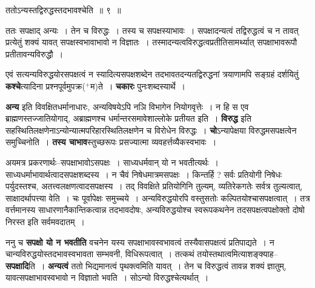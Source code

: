 \documentclass[article,12pt,a4paper]{memoir}
\newcommand{\add}[1]{($^{+}$#1)}
\begin{document}
	  \bigskip
	  \begingroup
	

	  \pstart ततोऽन्यस्तद्विरुद्धस्तदभावश्चेति ॥ ९ ॥
	\pend
      
	  \endgroup
	 

	  \pstart ततः सपक्षाद् अन्यः । तेन च विरुद्धः । तस्य च सपक्षस्याभावः । सपक्षादन्यत्वं तद्विरुद्धत्वं च न तावत् प्रत्येतुं शक्यं यावत् सपक्षस्वभावाभावो न विज्ञातः । तस्मादन्यत्वविरुद्धत्वप्रतीतिसामर्थ्यात् सपक्षाभावरूपौ प्रतीतावन्यविरुद्धौ ।
	\pend
      
	  \endgroup
	

	  \pstart एवं सत्यन्यविरुद्धयोरसपक्षत्वं न स्यादित्यसपक्षशब्देन तदभावतदन्यतद्विरुद्धनां त्रयाणामपि सङ्ग्रहं दर्शयितुं \textbf{कश्चे}त्यादिना प्रश्नपूर्वमुपक्र\add{म}ते । \textbf{चकारः} पुनःशब्दस्यार्थे ।
	\pend
      

	  \pstart \textbf{अन्य} इति विवक्षितधर्मानाधारः, अन्यविषयेऽपि नञि विभागेन नियोगवृत्तेः । न हि स एव ब्राह्मणस्तज्जातियोगाद्, अब्राह्मणश्च धर्मान्तरसमावेशाल्लोके प्रतीयत इति । \textbf{विरुद्ध} इति सहस्थितिलक्षणेनाऽन्योन्यात्मपरिहारस्थितिलक्षणेन च विरोधेन विरुद्धः । \textbf{चो}ऽन्यापेक्षया विरुद्धमसपक्षत्वेन समुच्चिनोति । \textbf{तस्य चाभाव}स्तुच्छरूपः प्रसज्यात्मा व्यवहर्त्तव्यैकस्वभावः ।
	\pend
      

	  \pstart अयमत्र प्रकरणार्थः--सपक्षाभावोऽसपक्षः । साध्यधर्मवान् यो न भवतीत्यर्थः । साध्यधर्माभावार्थत्वादसपक्षशब्दस्य । न चैवं निषेधमात्रमसपक्षः । किन्तर्हि ? सर्वः प्रतियोगी निषेधः पर्युदस्तश्च, अतत्त्वलक्षणत्वादसपक्षस्य । तद् विवक्षिते प्रतियोगिनि तुल्यम्, व्यतिरेकगतेः सर्वत्र तुल्यत्वात्, साक्षादर्थापत्त्या वेति । चः पूर्वापेक्षः समुच्चये । अन्यविरुद्धयोरपि वस्तुसतोः कल्पितयोश्चासपक्षत्वात् । तत्र वर्त्तमानस्य साधारणानैकान्तिकत्वान्न तदभावदोषः, अन्यविरुद्धयोश्च स्वरूपकथनेन तदसपक्षत्वपक्षोक्तो दोषो निरस्त इति सर्वमवदातम् ।
	\pend
      

	  \pstart ननु च \textbf{सपक्षो यो न भवतीति} वचनेन यस्य सपक्षाभावस्वभावत्वं तस्यैवासपक्षत्वं \leavevmode{}प्रतिपाद्यते । न चान्यविरुद्धयोस्तदभावस्वभावता सम्भवनी, विधिरूपत्वात् । तत्कथं तयोस्तथात्वमित्याशङ्क्याह--\textbf{सपक्षादि}ति । \textbf{अन्यत्वं} ततो भिद्यमानत्वं पृथक्त्वमिति यावत् । तेन च विरुद्धत्वं तावन्न शक्यं ज्ञातुम्, यावत्सपक्षाभावस्वभावो न विज्ञातो भवति । सोऽन्यो विरुद्धश्चेत्यर्थात् ।
	\pend
      
\end{document}

